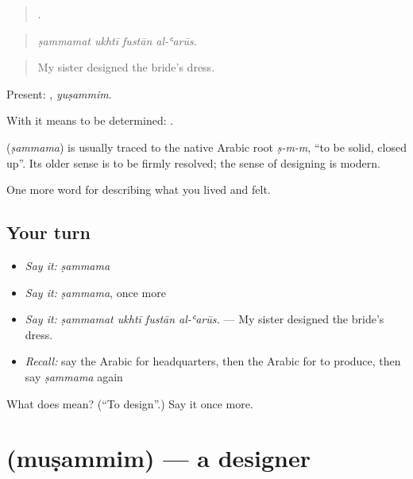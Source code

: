 \begin{quote}
   .
\end{quote}

\begin{quote}
\emph{ṣammamat ukhtī fustān al-ʿarūs.}
\end{quote}

\begin{quote}
My sister designed the bride's dress.
\end{quote}

Present: , \emph{yuṣammim}.

With  it means to be determined:   .

\begin{cousinweb}
\textbf{} (\emph{ṣammama}) is usually traced to the native Arabic root \emph{ṣ-m-m}, \textquotedblleft{}to be solid, closed up\textquotedblright{}. Its older sense is to be firmly resolved; the sense of designing is modern.
\end{cousinweb}

\begin{grammarlens}[title={What you've built}]
One more word for describing what you lived and felt.
\end{grammarlens}

\subsection*{Your turn}
\begin{itemize}
\raggedright
  \item \emph{Say it:} \emph{ṣammama}
  \item \emph{Say it:} \emph{ṣammama}, once more
  \item \emph{Say it:} \emph{ṣammamat ukhtī fustān al-ʿarūs.} — My sister designed the bride's dress.
  \item \emph{Recall:} say the Arabic for headquarters, then the Arabic for to produce, then say \emph{ṣammama} again
\end{itemize}

\begin{tcolorbox}[breakable,colback=teal!4,colframe=teal!35!black,title={Before you move on}]
What does  mean? (\textquotedblleft{}To design\textquotedblright{}.) Say it once more.
\end{tcolorbox}
\section[\texorpdfstring{\ar{مصمم} (muṣammim)}{مصمم (muṣammim)}]{ (muṣammim) — a designer}

